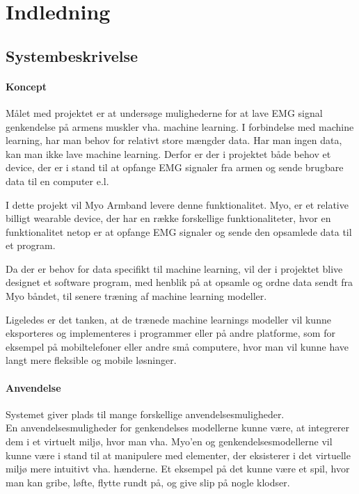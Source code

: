 \thispagestyle{fancy}
\chapter{Indledning}
\label{chp:indledning}

\section{Systembeskrivelse}

\subsubsection{Koncept}
Målet med projektet er at undersøge mulighederne for at lave EMG signal genkendelse på armens muskler vha. machine learning.
I forbindelse med machine learning, har man behov for relativt store mængder data. Har man ingen data, kan man ikke lave machine learning. Derfor er der i projektet både behov et device, der er i stand til at opfange EMG signaler fra armen og sende brugbare data til en computer e.l.
 
I dette projekt vil Myo Armband levere denne funktionalitet. Myo, er et relative billigt wearable device, der har en række forskellige funktionaliteter, hvor en funktionalitet netop er at opfange EMG signaler og sende den opsamlede data til et program. 

Da der er behov for data specifikt til machine learning, vil der i projektet blive designet et software program, med henblik på at opsamle og ordne data sendt fra Myo båndet, til senere træning af machine learning modeller.

Ligeledes er det tanken, at de trænede machine learnings modeller vil kunne eksporteres og implementeres i programmer eller på andre platforme, som for eksempel på mobiltelefoner eller andre små computere, hvor man vil kunne have langt mere fleksible og mobile løsninger.

\subsubsection{Anvendelse}
Systemet giver plads til mange forskellige anvendelsesmuligheder.\\

En anvendelsesmuligheder for genkendelses modellerne kunne være, at integrerer dem i et virtuelt miljø, hvor man vha. Myo’en og genkendelsesmodellerne vil kunne være i stand til at manipulere med elementer, der eksisterer i det virtuelle miljø mere intuitivt vha. hænderne. Et eksempel på det kunne være et spil, hvor man kan gribe, løfte, flytte rundt på, og give slip på nogle klodser.

